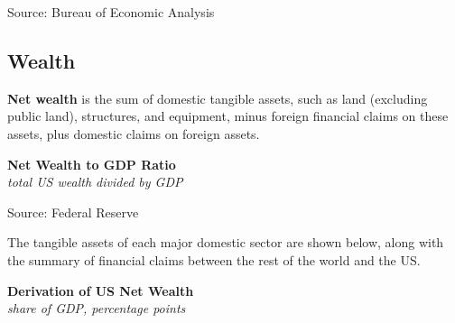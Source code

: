 \documentclass{report}
\makeatletter
\newcommand{\tbllink}[1]{\href{https://raw.githubusercontent.com/bdecon/US-chartbook/master/chartbook/data/#1}{\faTable}}
\newcommand*\short[1]{\expandafter\@gobbletwo\number\numexpr#1\relax}
\newcommand{\sbar}[4]{
		\addplot[ybar stacked, bar width=2.4pt, draw opacity=0, fill=#1] 
			table [x=#2, y=#3, col sep=comma]{#4};}
\newcommand{\absnode}[3]{\node[below right, align=left] at (axis cs: #1,#2) {#3};}
\newcommand{\dateaxisticks}{
		date coordinates in=x, axis line style={draw=none},
		xmax={2022-10-31},
		max space between ticks=40,	    
		xtick={{1990-01-01}, {1992-01-01}, {1994-01-01}, 
			{1996-01-01}, {1998-01-01}, {2000-01-01}, 
			{2002-01-01}, {2004-01-01}, {2006-01-01},
			{2008-01-01}, {2010-01-01}, {2012-01-01}, {2014-01-01},
		    {2016-01-01}, {2018-01-01}, {2020-01-01}, {2022-01-01}, 
		    {2024-01-01}, {2026-01-01}},
		minor xtick={{1989-01-01}, {1991-01-01}, {1993-01-01},
			{1995-01-01}, {1997-01-01}, {1999-01-01}, 
			{2001-01-01}, {2003-01-01}, {2005-01-01}, {2007-01-01},
		    {2009-01-01}, {2011-01-01}, {2013-01-01}, {2015-01-01},
		    {2017-01-01}, {2019-01-01}, {2021-01-01}, {2023-01-01}, 
		    {2025-01-01}, {2027-01-01}},
		enlarge y limits={0.06}, enlarge x limits={0.01},
		}
\newcommand{\bbar}[2]{extra #1 ticks = {{#2}}, extra #1 tick labels = ,
		extra #1 tick style = {grid=major, grid style={thick, black!25}},}
\newcommand{\rbars}{
		\fill[color=black!10] (axis cs:{1990-07-01},\pgfkeysvalueof{/pgfplots/ymin}) rectangle 
			(axis cs:{1991-03-01}, \pgfkeysvalueof{/pgfplots/ymax});
		\fill[color=black!10] (axis cs:{2007-12-01},\pgfkeysvalueof{/pgfplots/ymin}) rectangle 
			(axis cs:{2009-07-01}, \pgfkeysvalueof{/pgfplots/ymax});
		\fill[color=black!10] (axis cs:{2001-03-01},\pgfkeysvalueof{/pgfplots/ymin}) rectangle 
			(axis cs:{2001-11-01}, \pgfkeysvalueof{/pgfplots/ymax});
		\fill[color=black!10] (axis cs:{2020-02-01},\pgfkeysvalueof{/pgfplots/ymin}) rectangle 
			(axis cs:{2020-05-01}, \pgfkeysvalueof{/pgfplots/ymax});}
\makeatother
\begin{document}
{\begin{minipage}{0.76\textwidth}
\footnotesize{Source: Bureau of Economic Analysis} \hfill \tbllink{sectbal2.csv}
\end{minipage}
\newpage
\begin{minipage}{0.76\textwidth}
\subsection*{Wealth}
\hypertarget{ofw}{}
\small \textbf{Net wealth} is the sum of domestic tangible assets, such as land (excluding public land), structures, and equipment, minus foreign financial claims on these assets, plus domestic claims on foreign assets.   


\vspace{1mm}

\normalsize \textbf{Net Wealth to GDP Ratio}\\
\footnotesize{\textit{total US wealth divided by GDP}}
\vspace{3.4cm}

\hspace{2mm} 

\footnotesize{Source: Federal Reserve} \hfill \tbllink{wealthgdp.csv}
\vspace{2mm}

\small The tangible assets of each major domestic sector are shown below, along with the summary of financial claims between the rest of the world and the US.
\vspace{1mm}

\normalsize \textbf{Derivation of US Net Wealth}\\
\footnotesize{\textit{share of GDP, percentage points}}\\ 
 \setlength{\tabcolsep}{3.5pt} \color{black!90}
		{\renewcommand{\arraystretch}{1.65}
		 \begin{tabular}{p{40mm} R{7.8mm} R{7.8mm} R{7.8mm} R{7.8mm} 
		   R{8.2mm} R{8.2mm} R{8.2mm} }
			  \hline
		\end{tabular}}	\vspace{-2mm}
		

\end{minipage}}
\end{document}

